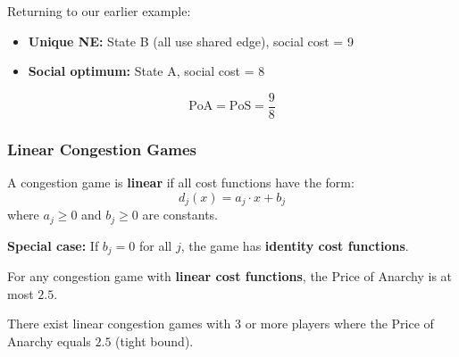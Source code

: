\begin{exbox}
Returning to our earlier example:
\begin{itemize}
  \item \textbf{Unique NE:} State B (all use shared edge), social cost = 9
  \item \textbf{Social optimum:} State A, social cost = 8
\end{itemize}

\[
\text{PoA} = \text{PoS} = \frac{9}{8}
\]
\end{exbox}

\bigseparator

\subsubsection{Linear Congestion Games}

\begin{defbox}
A congestion game is \textbf{linear} if all cost functions have the form:
\[
d_j(x) = a_j \cdot x + b_j
\]
where $a_j \geq 0$ and $b_j \geq 0$ are constants.

\textbf{Special case:} If $b_j = 0$ for all $j$, the game has \textbf{identity cost functions}.
\end{defbox}

\begin{thmbox}
For any congestion game with \textbf{linear cost functions}, the Price of Anarchy is at most $\mathbf{2.5}$.
\end{thmbox}

\begin{thmbox}
There exist linear congestion games with 3 or more players where the Price of Anarchy equals $\mathbf{2.5}$ (tight bound).
\end{thmbox}

